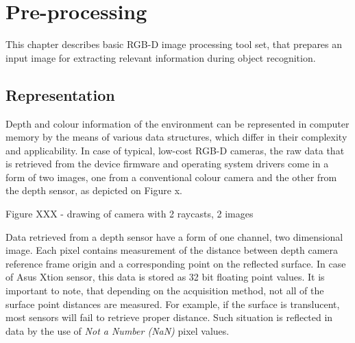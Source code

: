\chapter{Pre-processing}
\label{cha:preproc}

This chapter describes basic RGB-D image processing tool set, that prepares an input image for extracting relevant information during object recognition.


\section{Representation}
\label{sec:representation}



Depth and colour information of the environment can be represented in computer memory by the means of various data structures, which differ in their complexity and applicability. In case of typical, low-cost RGB-D cameras, the raw data that is retrieved from the device firmware and operating system drivers come in a form of two images, one from a conventional colour camera and the other from the depth sensor, as depicted on Figure x.

Figure XXX - drawing of camera with 2 raycasts, 2 images

Data retrieved from a depth sensor have a form of one channel, two dimensional image. Each pixel contains measurement of the distance between depth camera reference frame origin and a corresponding point on the reflected surface. In case of Asus Xtion sensor, this data is stored as 32 bit floating point values. It is important to note, that depending on the acquisition method, not all of the surface point distances are measured. For example, if the surface is translucent, most sensors will fail to retrieve proper distance. Such situation is reflected in data by the use of \textit{Not a Number (NaN)} pixel values.


